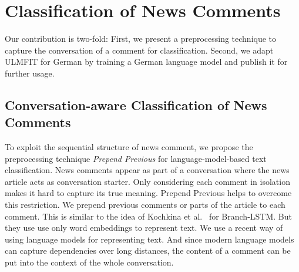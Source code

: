 \chapter{Classification of News Comments}
\label{ch:approach}

Our contribution is two-fold: First, we present a preprocessing technique to capture the conversation of a comment for classification.
Second, we adapt ULMFIT for German by training a German language model and publish it for further usage.

\section{Conversation-aware Classification of News Comments}
To exploit the sequential structure of news comment, we propose the preprocessing technique \textit{Prepend Previous} for language-model-based text classification.
News comments appear as part of a conversation where the news article acts as conversation starter.
Only considering each comment in isolation makes it hard to capture its true meaning.
Prepend Previous helps to overcome this restriction.
We prepend previous comments or parts of the article to each comment.
This is similar to the idea of Kochkina et al.~\cite{kochkina2017turing} for Branch-LSTM.
But they use use only word embeddings to represent text.
We use a recent way of using language models for representing text.
And since modern language models can capture dependencies over long distances, the content of a comment can be put into the context of the whole conversation.

